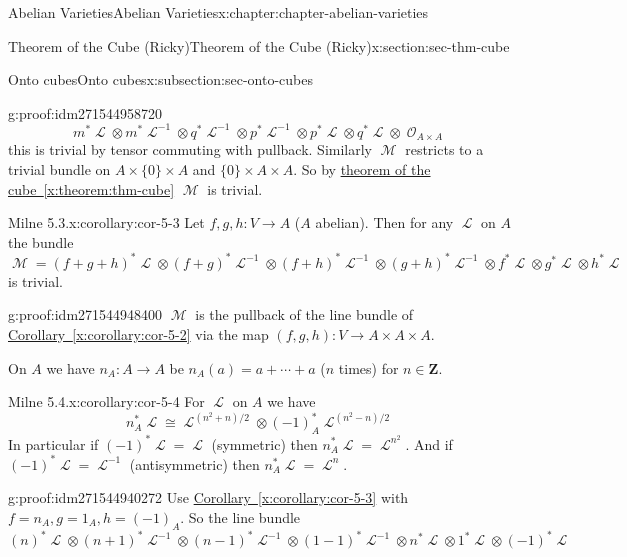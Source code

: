 \documentclass[oneside,10pt,]{book}
\numberwithin{equation}{section}
\newcommand{\sheaf}[1]{\operatorname{\mathcal{#1}}}
\newcommand{\ZZ}{\mathbf{Z}}
\begin{document}
\begin{chapterptx}{Abelian Varieties}{}{Abelian Varieties}{}{}{x:chapter:chapter-abelian-varieties}
\begin{sectionptx}{Theorem of the Cube (Ricky)}{}{Theorem of the Cube (Ricky)}{}{}{x:section:sec-thm-cube}
\begin{subsectionptx}{Onto cubes}{}{Onto cubes}{}{}{x:subsection:sec-onto-cubes}
\begin{proofptx}{}{g:proof:idm271544958720}
\begin{equation*}
m^* \sheaf L \otimes m^* \sheaf L^{-1} \otimes q^* \sheaf L^{-1} \otimes p^*\sheaf L^{-1} \otimes p^*\sheaf L \otimes q^*\sheaf L \otimes \sheaf O_{A\times A}
\end{equation*}
this is trivial by tensor commuting with pullback. Similarly \(\sheaf M\) restricts to a trivial bundle on \(A\times \{0\} \times A\) and \(\{0\}\times A \times A\). So by \hyperref[x:theorem:thm-cube]{theorem of the cube~\ref{x:theorem:thm-cube}} \(\sheaf M\) is trivial.%
\end{proofptx}
\begin{corollary}{Milne 5.3.}{}{x:corollary:cor-5-3}%
Let \(f,g, h\colon V \to A\) (\(A\) abelian). Then for any \(\sheaf L\) on \(A\) the bundle%
\begin{equation*}
\sheaf M  = (f+g+h)^*\sheaf L \otimes (f+g)^*\sheaf L^{-1}\otimes (f+h)^*\sheaf L^{-1}\otimes (g+h)^*\sheaf L^{-1} \otimes   f^*\sheaf L \otimes   g^*\sheaf L \otimes   h^*\sheaf L
\end{equation*}
is trivial.%
\end{corollary}
\begin{proofptx}{}{g:proof:idm271544948400}
\(\sheaf M\) is the pullback of the line bundle of \hyperref[x:corollary:cor-5-2]{Corollary~\ref{x:corollary:cor-5-2}} via the map \((f,g,h) \colon V \to A\times A\times A\).%
\end{proofptx}
On \(A\) we have \(n_A \colon A\to A\) be \(n_A(a) = a+\cdots + a\) (\(n\) times) for \(n\in \ZZ\).%
\begin{corollary}{Milne 5.4.}{}{x:corollary:cor-5-4}%
For \(\sheaf L\) on \(A\) we have%
\begin{equation*}
n^*_A\sheaf L \cong \sheaf L^{(n^2 + n)/2} \otimes (-1)_A^* \sheaf L^{(n^2 - n)/2}
\end{equation*}
In particular if \((-1)^* \sheaf L = \sheaf L\) (symmetric) then \(n_A^* \sheaf L = \sheaf L^{n^2}\). And if \((-1)^* \sheaf L = \sheaf L^{-1}\) (antisymmetric) then \(n_A^* \sheaf L = \sheaf L^{n}\).%
\end{corollary}
\begin{proofptx}{}{g:proof:idm271544940272}
Use \hyperref[x:corollary:cor-5-3]{Corollary~\ref{x:corollary:cor-5-3}} with \(f= n_A, g = 1_A, h = (-1)_A\). So the line bundle%
\begin{equation*}
(n)^*\sheaf L \otimes (n+1)^*\sheaf L^{-1}\otimes (n-1)^*\sheaf L^{-1}\otimes (1-1)^*\sheaf L^{-1} \otimes   n^*\sheaf L \otimes   1^*\sheaf L \otimes   (-1)^*\sheaf L
\end{equation*}

\end{proofptx}
\end{subsectionptx}
\end{sectionptx}
\end{chapterptx}
\end{document}
